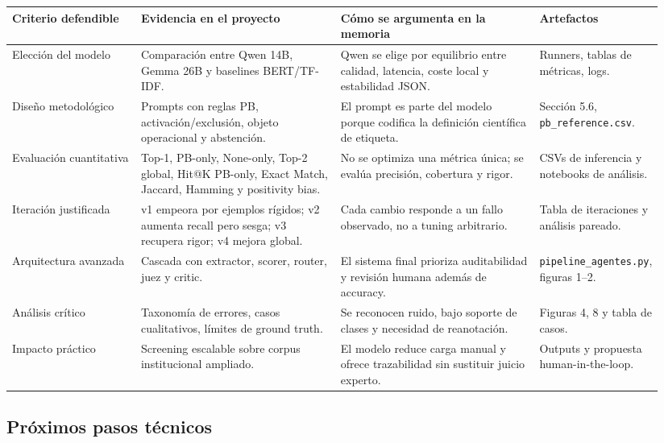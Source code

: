 \begin{center}
\scriptsize
\setlength{\tabcolsep}{4pt}
\renewcommand{\arraystretch}{1.18}
\begin{tabular}{p{0.20\linewidth}p{0.31\linewidth}p{0.31\linewidth}p{0.12\linewidth}}
\toprule
Criterio defendible & Evidencia en el proyecto & Cómo se argumenta en la memoria & Artefactos \\
\midrule
Elección del modelo & Comparación entre Qwen 14B, Gemma 26B y baselines BERT/TF-IDF. & Qwen se elige por equilibrio entre calidad, latencia, coste local y estabilidad JSON. & Runners, tablas de métricas, logs. \\
Diseño metodológico & Prompts con reglas PB, activación/exclusión, objeto operacional y abstención. & El prompt es parte del modelo porque codifica la definición científica de etiqueta. & Sección 5.6, \texttt{pb\_reference.csv}. \\
Evaluación cuantitativa & Top-1, PB-only, None-only, Top-2 global, Hit@K PB-only, Exact Match, Jaccard, Hamming y positivity bias. & No se optimiza una métrica única; se evalúa precisión, cobertura y rigor. & CSVs de inferencia y notebooks de análisis. \\
Iteración justificada & v1 empeora por ejemplos rígidos; v2 aumenta recall pero sesga; v3 recupera rigor; v4 mejora global. & Cada cambio responde a un fallo observado, no a tuning arbitrario. & Tabla de iteraciones y análisis pareado. \\
Arquitectura avanzada & Cascada con extractor, scorer, router, juez y critic. & El sistema final prioriza auditabilidad y revisión humana además de accuracy. & \texttt{pipeline\_agentes.py}, figuras 1--2. \\
Análisis crítico & Taxonomía de errores, casos cualitativos, límites de ground truth. & Se reconocen ruido, bajo soporte de clases y necesidad de reanotación. & Figuras 4, 8 y tabla de casos. \\
Impacto práctico & Screening escalable sobre corpus institucional ampliado. & El modelo reduce carga manual y ofrece trazabilidad sin sustituir juicio experto. & Outputs y propuesta human-in-the-loop. \\
\bottomrule
\end{tabular}
\end{center}

\subsection{Próximos pasos técnicos}

